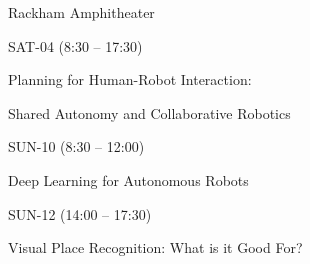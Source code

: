 \documentclass{article}
\begin{document}
\rssheader[2in]

\rssbig
\begin{center}
Rackham Amphitheater
\end{center}

\vfill

\rssmed
\begin{center}
SAT-04 (8:30 -- 17:30)
\end{center}

\rsssm
\begin{center}
Planning for Human-Robot Interaction: \par \noindent Shared Autonomy and
Collaborative Robotics
\end{center}

\vfill

\rssmed
\begin{center}
SUN-10 (8:30 -- 12:00)
\end{center}

\rsssm
\begin{center}
Deep Learning for Autonomous Robots
\end{center}

\vfill

\rssmed
\begin{center}
SUN-12 (14:00 -- 17:30)
\end{center}

\rsssm
\begin{center}
Visual Place Recognition: What is it Good For?
\end{center}

\vfill
\end{document}
